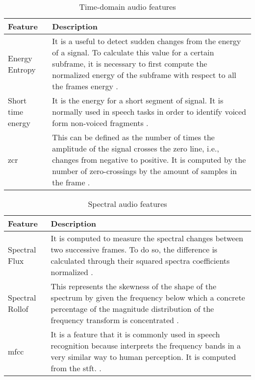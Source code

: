 	\begin{table}[h!]
		\begin{center}
			\begin{tabular}{|| m{7em} | m{22em} ||}
				\hline
				\textbf{Feature} & \textbf{Description} \\
				\hline\hline
				Energy Entropy & It is a useful to detect sudden changes from the energy of a signal. To calculate this value for a certain subframe, it is necessary to first compute the normalized energy of the subframe with respect to all the frames energy \cite{Giannakopoulos2006}. \\
				\hline
				Short time energy & It is the energy for a short segment of signal. It is normally used in speech tasks in order to identify voiced form non-voiced fragments \cite{Garcia-Gomez2016}. \\
				\hline
				\acrfull{zcr} & This can be defined as the number of times the amplitude of the signal crosses the zero line, i.e., changes from negative to positive. It is computed by the number of zero-crossings by the amount of samples in the frame \cite{Giannakopoulos2006}. \\
				\hline
			\end{tabular}
		\end{center}
		\caption{Time-domain audio features}
		\label{table:6}
	\end{table}
	
	\begin{table}[h!]
		\begin{center}
			\begin{tabular}{|| m{7em} | m{22em} ||}
				\hline
				\textbf{Feature} & \textbf{Description} \\
				\hline\hline
				Spectral Flux & It is computed to measure the spectral changes between two successive frames. To do so, the difference is calculated through their squared spectra coefficients normalized \cite{Giannakopoulos2006}. \\
				\hline
				Spectral Rollof & This represents the skewness of the shape of the spectrum by given the frequency below which a concrete percentage of the magnitude distribution of the frequency transform is concentrated \cite{Garcia-Gomez2016}. \\
				\hline
				\acrshort{mfcc} & It is a feature that it is commonly used in speech recognition because interprets the frequency bands in a very similar way to human perception. It is computed from the \acrshort{stft}. \doubt{A detailed explanation can be found in appendix \ref{}} \cite{Garcia-Gomez2016}. \\
				\hline
			\end{tabular}
		\end{center}
		\caption{Spectral audio features}
		\label{table:7}
	\end{table}

	
	
	